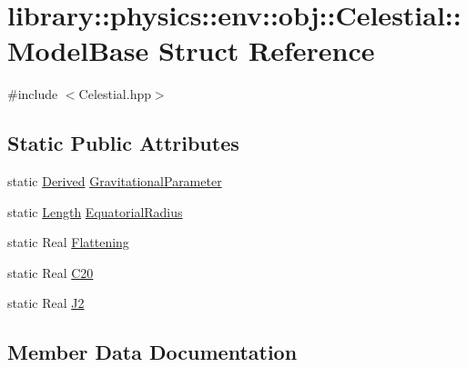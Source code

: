 \hypertarget{structlibrary_1_1physics_1_1env_1_1obj_1_1_celestial_1_1_model_base}{}\section{library\+:\+:physics\+:\+:env\+:\+:obj\+:\+:Celestial\+:\+:Model\+Base Struct Reference}
\label{structlibrary_1_1physics_1_1env_1_1obj_1_1_celestial_1_1_model_base}


{\ttfamily \#include $<$Celestial.\+hpp$>$}

\subsection*{Static Public Attributes}
\begin{DoxyCompactItemize}
\item 
static \hyperlink{classlibrary_1_1physics_1_1units_1_1_derived}{Derived} \hyperlink{structlibrary_1_1physics_1_1env_1_1obj_1_1_celestial_1_1_model_base_a5a22d88e12db9e31540f3a7ac0bed8f4}{Gravitational\+Parameter}
\item 
static \hyperlink{classlibrary_1_1physics_1_1units_1_1_length}{Length} \hyperlink{structlibrary_1_1physics_1_1env_1_1obj_1_1_celestial_1_1_model_base_a0d82235af2ed136eb0a46ba4cd3f4d85}{Equatorial\+Radius}
\item 
static Real \hyperlink{structlibrary_1_1physics_1_1env_1_1obj_1_1_celestial_1_1_model_base_ac035d69e3827f37130a5ee3977586a54}{Flattening}
\item 
static Real \hyperlink{structlibrary_1_1physics_1_1env_1_1obj_1_1_celestial_1_1_model_base_ab653a41c85c2974d426e82a4d18ad9b4}{C20}
\item 
static Real \hyperlink{structlibrary_1_1physics_1_1env_1_1obj_1_1_celestial_1_1_model_base_a9016f0c506cfd899a9854c052419c653}{J2}
\end{DoxyCompactItemize}


\subsection{Member Data Documentation}
\mbox{\label{structlibrary_1_1physics_1_1env_1_1obj_1_1_celestial_1_1_model_base_ab653a41c85c2974d426e82a4d18ad9b4}} 
